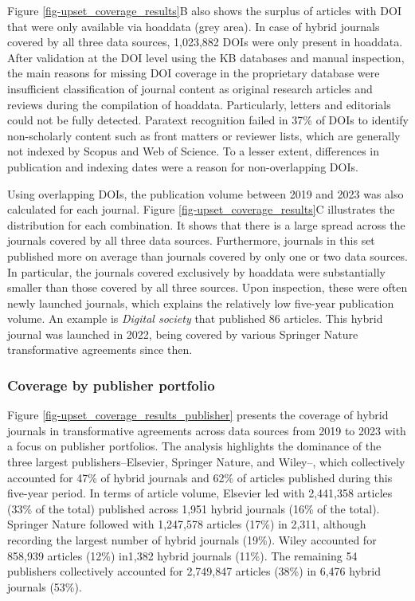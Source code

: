 \documentclass[a4paper,man,floatsintext,longtable,noextraspace,10pt]{apa6}
\begin{document}
Figure \ref{fig-upset_coverage_results}B also shows the surplus of
articles with DOI that were only available via hoaddata (grey area). In
case of hybrid journals covered by all three data sources, 1,023,882
DOIs were only present in hoaddata. After validation at the DOI level
using the KB databases and manual inspection, the main reasons for
missing DOI coverage in the proprietary database were insufficient
classification of journal content as original research articles and
reviews during the compilation of hoaddata. Particularly, letters and
editorials could not be fully detected. Paratext recognition failed in
37\% of DOIs to identify non-scholarly content such as front matters or
reviewer lists, which are generally not indexed by Scopus and Web of
Science. To a lesser extent, differences in publication and indexing
dates were a reason for non-overlapping DOIs.

Using overlapping DOIs, the publication volume between 2019 and 2023 was
also calculated for each journal. Figure
\ref{fig-upset_coverage_results}C illustrates the distribution for each
combination. It shows that there is a large spread across the journals
covered by all three data sources. Furthermore, journals in this set
published more on average than journals covered by only one or two data
sources. In particular, the journals covered exclusively by hoaddata
were substantially smaller than those covered by all three sources. Upon
inspection, these were often newly launched journals, which explains the
relatively low five-year publication volume. An example is \emph{Digital
society} that published 86 articles. This hybrid journal was launched in
2022, being covered by various Springer Nature transformative agreements
since then.

\subsubsection{Coverage by publisher
portfolio}\label{coverage-by-publisher-portfolio}

Figure \ref{fig-upset_coverage_results_publisher} presents the coverage
of hybrid journals in transformative agreements across data sources from
2019 to 2023 with a focus on publisher portfolios. The analysis
highlights the dominance of the three largest publishers--Elsevier,
Springer Nature, and Wiley--, which collectively accounted for 47\% of
hybrid journals and 62\% of articles published during this five-year
period. In terms of article volume, Elsevier led with 2,441,358 articles
(33\% of the total) published across 1,951 hybrid journals (16\% of the
total). Springer Nature followed with 1,247,578 articles (17\%) in
2,311, although recording the largest number of hybrid journals (19\%).
Wiley accounted for 858,939 articles (12\%) in1,382 hybrid journals
(11\%). The remaining 54 publishers collectively accounted for 2,749,847
articles (38\%) in 6,476 hybrid journals (53\%).
\end{document}

